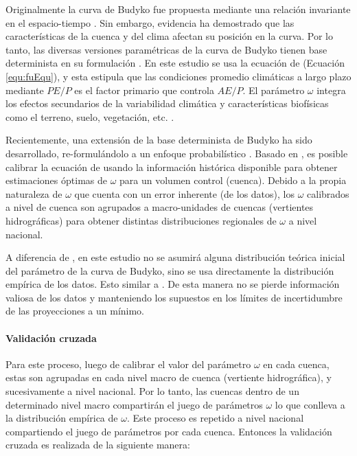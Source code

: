 \documentclass[12pt]{article}
\begin{document}
Originalmente la curva de Budyko fue propuesta mediante una relación invariante en el espacio-tiempo \citep{Budyko1961,Pike1964}. Sin embargo, evidencia ha demostrado que las características de la cuenca y del clima afectan su posición en la curva. Por lo tanto, las diversas versiones paramétricas de la curva de Budyko tienen base determinista en su formulación \citep{Fu1981,Zhang2004,Zhang2008,Wang2014}. En este estudio se usa la ecuación de \citep{Fu1981} (Ecuación \ref{equ:fuEqu}), y esta estipula que las condiciones promedio climáticas a largo plazo mediante $PE/P$ es el factor primario que controla $AE/P$. El parámetro $\omega$ integra los efectos secundarios de la variabilidad climática y características biofísicas como el terreno, suelo, vegetación, etc. \citep{Gentine2012,Berghuijs2014}.

Recientemente, una extensión de la base determinista de Budyko ha sido desarrollado, re-formulándolo a un enfoque probabilístico \citep{Greve2015}. Basado en \citet{Greve2015}, es posible calibrar la ecuación de \cite{Fu1981} usando la información histórica disponible para obtener estimaciones óptimas de $\omega$ para un volumen control (cuenca). Debido a la propia naturaleza de $\omega$ que cuenta con un error inherente (de los datos), los $\omega$ calibrados a nivel de cuenca son agrupados a macro-unidades de cuencas (vertientes hidrográficas) para obtener distintas distribuciones regionales de $\omega$ a nivel nacional.

A diferencia de \citet{Greve2015}, en este estudio no se asumirá alguna distribución teórica inicial del parámetro de la curva de Budyko, sino se usa directamente la distribución empírica de los datos. Esto similar a \citet{Singh2015}. De esta manera no se pierde información valiosa de los datos y manteniendo los supuestos en los límites de incertidumbre de las proyecciones a un mínimo.

\paragraph{Validación cruzada}\mbox{}

Para este proceso, luego de calibrar el valor del parámetro $\omega$ en cada cuenca, estas son agrupadas en cada nivel macro de cuenca (vertiente hidrográfica), y sucesivamente a nivel nacional. Por lo tanto, las cuencas dentro de un determinado nivel macro compartirán el juego de parámetros $\omega$ lo que conlleva a la distribución empírica de $\omega$. Este proceso es repetido a nivel nacional compartiendo el juego de parámetros por cada cuenca. Entonces la validación cruzada es realizada de la siguiente manera:
\end{document}
